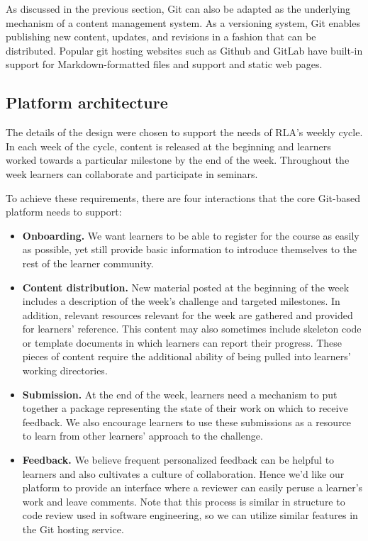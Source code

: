\documentclass[12pt,twoside,vi]{mitthesis}
\begin{document}
As discussed in the previous section, Git can also be adapted as the underlying mechanism of a content management system. As a versioning system, Git enables publishing new content, updates, and revisions in a fashion that can be distributed. Popular git hosting websites such as Github and GitLab have built-in support for Markdown-formatted files and support and static web pages.

\subsection{Platform architecture}

The details of the design were chosen to support the needs of RLA's weekly cycle. In each week of the cycle, content is released at the beginning and learners worked towards a particular milestone by the end of the week. Throughout the week learners can collaborate and participate in seminars.

To achieve these requirements, there are four interactions that the core Git-based platform needs to support:
\begin{itemize}
\item \textbf{Onboarding.} We want learners to be able to register for the course as easily as possible, yet still provide basic information to introduce themselves to the rest of the learner community. 
\item \textbf{Content distribution.} New material posted at the beginning of the week includes a description of the week's challenge and targeted milestones. In addition, relevant resources relevant for the week are gathered and provided for learners' reference. This content may also sometimes include skeleton code or template documents in which learners can report their progress. These pieces of content require the additional ability of being pulled into learners' working directories.
\item \textbf{Submission.} At the end of the week, learners need a mechanism to put together a package representing the state of their work on which to receive feedback. We also encourage learners to use these submissions as a resource to learn from other learners' approach to the challenge.
\item \textbf{Feedback.} We believe frequent personalized feedback can be helpful to learners and also cultivates a culture of collaboration. Hence we'd like our platform to provide an interface where a reviewer can easily peruse a learner's work and leave comments. Note that this process is similar in structure to code review used in software engineering, so we can utilize similar features in the Git hosting service.
\end{itemize}
\end{document}
